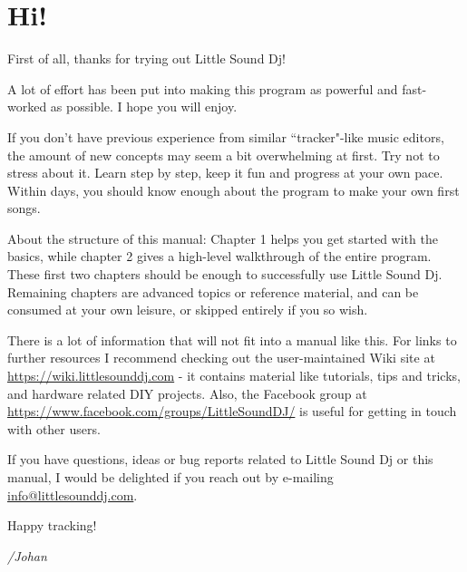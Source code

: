 \chapter*{Hi!}
First of all, thanks for trying out Little Sound Dj!

A lot of effort has been put into making this program as powerful and fast-worked as possible. I hope you will enjoy.

If you don't have previous experience from similar ``tracker"-like music editors, the amount of new concepts may seem a bit overwhelming at first.  Try not to stress about it. Learn step by step, keep it fun and progress at your own pace. Within days, you should know enough about the program to make your own first songs.

About the structure of this manual: Chapter 1 helps you get started with the basics, while chapter 2 gives a high-level walkthrough of the entire program. These first two chapters should be enough to successfully use Little Sound Dj. Remaining chapters are advanced topics or reference material, and can be consumed at your own leisure, or skipped entirely if you so wish.

There is a lot of information that will not fit into a manual like this. For links to further resources I recommend checking out the user-maintained Wiki site at \url{https://wiki.littlesounddj.com} - it contains material like tutorials, tips and tricks, and hardware related DIY projects. Also, the Facebook group at \url{https://www.facebook.com/groups/LittleSoundDJ/} is useful for getting in touch
with other users.

If you have questions, ideas or bug reports related to Little Sound Dj or this manual, I would be delighted if you reach out by e-mailing \href{mailto:info@littlesounddj.com}{info@littlesounddj.com}.

Happy tracking!

\textit{/Johan}

